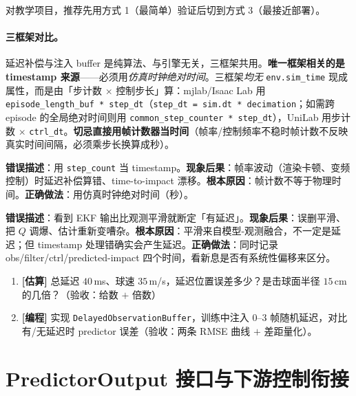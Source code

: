 对教学项目，推荐先用方式 1（最简单）验证后切到方式 3（最接近部署）。

\paragraph{三框架对比。}延迟补偿与注入 buffer 是纯算法、与引擎无关，三框架共用。\textbf{唯一框架相关的是 timestamp 来源}——必须用\emph{仿真时钟绝对时间}。三框架\emph{均无} \verb|env.sim_time| 现成属性，而是由「步计数 $\times$ 控制步长」算：mjlab/Isaac Lab 用 \verb|episode_length_buf * step_dt|（\verb|step_dt = sim.dt * decimation|；如需跨 episode 的全局绝对时间则用 \verb|common_step_counter * step_dt|），UniLab 用步计数 $\times$ \verb|ctrl_dt|。\textbf{切忌直接用帧计数器当时间}（帧率/控制频率不稳时帧计数不反映真实时间间隔，必须乘步长换算成秒）。

\begin{pitfall}
\textbf{错误描述}：用 \verb|step_count| 当 timestamp。\textbf{现象后果}：帧率波动（渲染卡顿、变频控制）时延迟补偿算错、time-to-impact 漂移。\textbf{根本原因}：帧计数不等于物理时间。\textbf{正确做法}：用仿真时钟绝对时间（秒）。
\end{pitfall}

\begin{pitfall}
\textbf{错误描述}：看到 EKF 输出比观测平滑就断定「有延迟」。\textbf{现象后果}：误删平滑、把 $Q$ 调爆、估计重新变嘈杂。\textbf{根本原因}：平滑来自模型-观测融合，不一定是延迟；但 timestamp 处理错确实会产生延迟。\textbf{正确做法}：同时记录 obs/filter/ctrl/predicted-impact 四个时间，看新息是否有系统性偏移来区分。
\end{pitfall}

\begin{practice}[本节动手任务]
\begin{enumerate}
  \item \textbf{[估算]} 总延迟 $40$\,ms、球速 $35$\,m/s，延迟位置误差多少？是击球面半径 $15$\,cm 的几倍？（验收：给数 $+$ 倍数）
  \item \textbf{[编程]} 实现 \verb|DelayedObservationBuffer|，训练中注入 $0$--$3$ 帧随机延迟，对比有/无延迟时 predictor 误差（验收：两条 RMSE 曲线 $+$ 差距量化）。
\end{enumerate}
\end{practice}

\section{PredictorOutput 接口与下游控制衔接}
\label{sec:rlmc-perc-interface}

